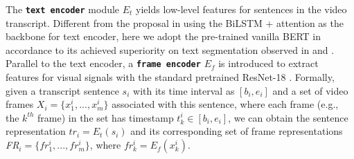\documentclass[runningheads]{llncs}
\begin{document}
The \textbf{\texttt{text encoder}} module $E_t$ yields low-level features for sentences in the video transcript. Different from the proposal in \cite{koshorek-etal-2018-text} using the BiLSTM + attention as the backbone for text encoder, here we adopt the pre-trained vanilla BERT \cite{devlin-etal-2019-bert} in accordance to its achieved superiority on text segmentation observed in \cite{xing-etal-2020-improving} and \cite{lukasik-etal-2020-text}. Parallel to the text encoder, a \textbf{\texttt{frame encoder}} $E_f$ is introduced to extract features for visual signals with the standard pretrained ResNet-18 %
\cite{7780459}. Formally, given a transcript sentence $s_i$ with its time interval as $[b_i, e_i]$ and a set of video frames $X_i = \{ x^i_1, ... , x^i_m \}$ associated with this sentence, where each frame (e.g., the $k^{th}$ frame) in the set has timestamp $t^i_k \in [b_i, e_i]$, we can obtain the sentence representation $tr_i = E_t(s_i)$ and its corresponding set of frame representations \textit{FR}$_i = \{ fr^i_1, ... , fr^i_m \}$, where $fr^i_k = E_f(x^i_k)$.
\end{document}
